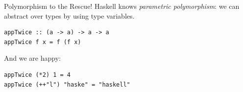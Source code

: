 \documentclass{beamer}
\begin{document}


\begin{frame}[fragile]{Polymorphism to the Rescue!}
Haskell knows \emph{parametric polymorphism}: we
can abstract over types by using type variables.

\pause

\begin{verbatim}
appTwice :: (a -> a) -> a -> a
appTwice f x = f (f x)
\end{verbatim}

\pause
And we are happy:

\begin{verbatim}
appTwice (*2) 1 = 4
appTwice (++"l") "haske" = "haskell"
\end{verbatim}

\pause
{}

\end{frame}

\begin{frame}
\end{frame}
\end{document}
